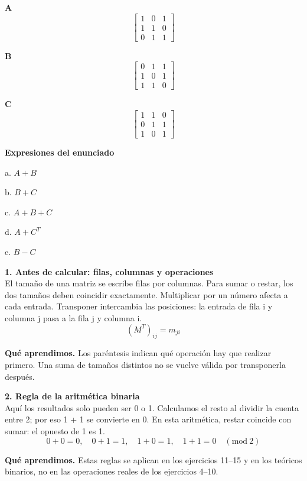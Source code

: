 \documentclass[11pt,a4paper,landscape]{article}
\begin{document}
\par\smallskip \begin{minipage}[t]{.47\linewidth}\centering \textbf{A}\[\begin{bmatrix}1 & 0 & 1\\1 & 1 & 0\\0 & 1 & 1\end{bmatrix}\]\end{minipage}\hfill\begin{minipage}[t]{.47\linewidth}\centering \textbf{B}\[\begin{bmatrix}0 & 1 & 1\\1 & 0 & 1\\1 & 1 & 0\end{bmatrix}\]\end{minipage}\par\smallskip
\par\smallskip \begin{minipage}[t]{.47\linewidth}\centering \textbf{C}\[\begin{bmatrix}1 & 1 & 0\\0 & 1 & 1\\1 & 0 & 1\end{bmatrix}\]\end{minipage}\par\smallskip
\textbf{Expresiones del enunciado}\par
a. \(A+B\)\par
b. \(B+C\)\par
c. \(A+B+C\)\par
d. \(A+C^T\)\par
e. \(B-C\)\par
\par\medskip
\noindent\begin{minipage}{\linewidth}\textbf{1. Antes de calcular: filas, columnas y operaciones}\\[2pt]El tamaño de una matriz se escribe filas por columnas. Para sumar o restar, los dos tamaños deben coincidir exactamente. Multiplicar por un número afecta a cada entrada. Transponer intercambia las posiciones: la entrada de fila i y columna j pasa a la fila j y columna i.
\[(M^T)_{ij}=m_{ji}\]
\par\smallskip\textbf{Qué aprendimos.} Los paréntesis indican qué operación hay que realizar primero. Una suma de tamaños distintos no se vuelve válida por transponerla después.
\end{minipage}\par\medskip
\noindent\begin{minipage}{\linewidth}\textbf{2. Regla de la aritmética binaria}\\[2pt]Aquí los resultados solo pueden ser 0 o 1. Calculamos el resto al dividir la cuenta entre 2; por eso 1 + 1 se convierte en 0. En esta aritmética, restar coincide con sumar: el opuesto de 1 es 1.
\[0+0=0,\quad 0+1=1,\quad1+0=1,\quad1+1=0\quad(\mathrm{mod}\ 2)\]
\par\smallskip\textbf{Qué aprendimos.} Estas reglas se aplican en los ejercicios 11–15 y en los teóricos binarios, no en las operaciones reales de los ejercicios 4–10.
\end{minipage}\par\medskip
\end{document}
